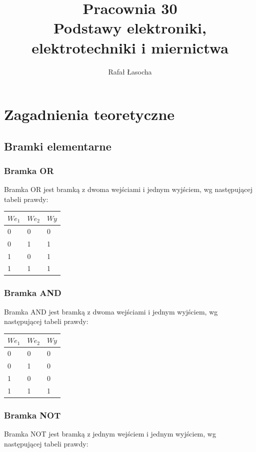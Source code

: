 \documentclass[a4paper,11pt]{article}
\title{
  \textbf{Pracownia 30}\\
  {\Large Podstawy elektroniki, elektrotechniki i miernictwa}
}
\author{Rafał Łasocha}
\begin{document}
\maketitle

\section{Zagadnienia teoretyczne}

\subsection{Bramki elementarne}

\subsubsection{Bramka OR}
Bramka OR jest bramką z dwoma wejściami i jednym wyjściem, wg następującej tabeli prawdy:

\begin{center}
	\begin{tabular}{|l|l|l|}\hline
	$We_1$ & $We_2$ & $Wy$ \\ \hline
	0 & 0 & 0 \\
	0 & 1 & 1 \\
	1 & 0 & 1 \\
	1 & 1 & 1 \\ \hline
	\end{tabular}
\end{center}

\subsubsection{Bramka AND}
Bramka AND jest bramką z dwoma wejściami i jednym wyjściem, wg następującej tabeli prawdy:

\begin{center}
	\begin{tabular}{|l|l|l|}\hline
	$We_1$ & $We_2$ & $Wy$ \\ \hline
	0 & 0 & 0 \\
	0 & 1 & 0 \\
	1 & 0 & 0 \\
	1 & 1 & 1 \\ \hline
	\end{tabular}
\end{center}

\subsubsection{Bramka NOT}
Bramka NOT jest bramką z jednym wejściem i jednym wyjściem, wg następującej tabeli prawdy:
\end{document}
